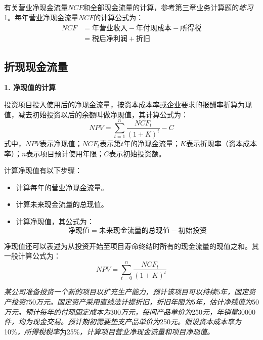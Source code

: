 \documentclass[
  10pt,
  twoside,
  openany,
  b5paper, %
  colorscheme = black, %
  xits = false,
]{qyxf-book}
\begin{document}
有关营业净现金流量$NCF$和全部现金流量的计算，参考第三章业务计算题的\emph{练习}1。每年营业净现金流量$NCF$的计算公式为：
\begin{equation*}
	\begin{aligned}
		NCF &= \text{年营业收入} - \text{年付现成本} - \text{所得税} \\
	&= \text{税后净利润} + \text{折旧}
	\end{aligned}
\end{equation*}

\subsection{折现现金流量}

\textbf{1. 净现值的计算}

投资项目投入使用后的净现金流量，按资本成本率或企业要求的报酬率折算为现值，减去初始投资以后的余额叫做净现值，其计算公式为：
\begin{equation*}
	NPV = \sum_{t=1}^{n} \frac{NCF_t}{(1+K)^t}-C
\end{equation*}
式中，$NPV$表示净现值；$NCF_t$表示第$t$年的净现金流量；$K$表示折现率（资本成本率）；$n$表示项目预计使用年限；$C$表示初始投资额。

计算净现值有以下步骤：
\begin{itemize}
	\item 计算每年的营业净现金流量。
	\item 计算未来现金流量的总现值。
	\item 计算净现值，其公式为：
	\begin{equation*}
		\text{净现值} = \text{未来现金流量的总现值}- \text{初始投资}
	\end{equation*}
\end{itemize}
净现值还可以表述为从投资开始至项目寿命终结时所有的现金流量的现值之和。其一般计算公式为：
\begin{equation*}
	NPV = \sum_{t=0}^{n} \frac{NCF_t}{(1+K)^t}
\end{equation*}

\emph{某公司准备投资一个新的项目以扩充生产能力，预计该项目可以持续}5\emph{年，固定资产投资}750\emph{万元。固定资产采用直线法计提折旧，折旧年限为}5\emph{年，估计净残值为}50\emph{万元。预计每年的付现固定成本为}300\emph{万元，每间产品单价为}250\emph{元，年销量}30000\emph{件，均为现金交易。预计期初需要垫支产品单价为}250\emph{元。假设资本成本率为}10\%\emph{，所得税税率}为25\%\emph{，计算项目营业净现金流量和项目净现值。}
\end{document}
